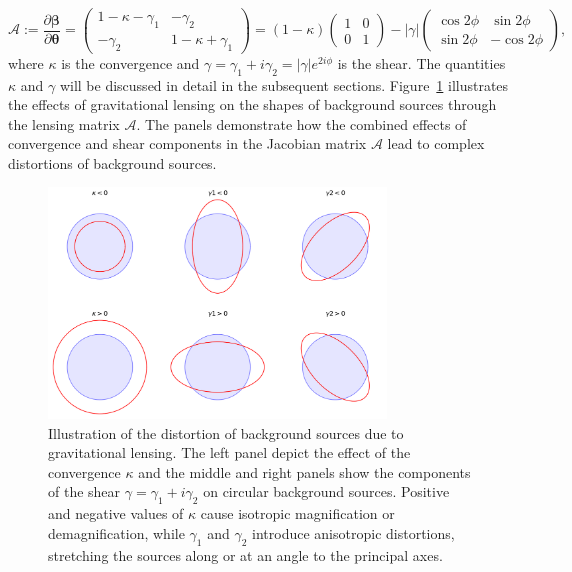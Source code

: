 \begin{equation}
\label{eq:jacobian_matrix}
    \mathcal{A} := \frac{\partial \boldsymbol{\beta}}{\partial \boldsymbol{\theta}} = 
    \begin{pmatrix}
        1 - \kappa - \gamma_1 & -\gamma_2 \\
        -\gamma_2 & 1 - \kappa + \gamma_1
    \end{pmatrix}
    = \left(1 - \kappa \right) 
    \begin{pmatrix}
        1 & 0 \\
        0 & 1
    \end{pmatrix}
    - |\gamma|
    \begin{pmatrix}
        \cos{2\phi} & \sin{2\phi} \\
        \sin{2\phi} & -\cos{2\phi}
    \end{pmatrix},
\end{equation}
where $\kappa$ is the convergence and $\gamma = \gamma_1 + i\gamma_2 = |\gamma| e^{2i\phi}$ is the shear.
The quantities $\kappa$ and $\gamma$ will be discussed in detail in the subsequent sections.
Figure~\ref{fig:distortion} illustrates the effects of gravitational lensing on the shapes of background sources through the lensing matrix $\mathcal{A}$. The panels demonstrate how the combined effects of convergence and shear components in the Jacobian matrix $\mathcal{A}$ lead to complex distortions of background sources.
\begin{figure}[ht]
    \centering
    \includegraphics[width=0.8\textwidth]{figures/distortion.png}
    \caption[Illustration of Gravitational Lensing]{Illustration of the distortion of background sources due to gravitational lensing. The left panel depict the effect of the convergence $\kappa$ and the middle and right panels show the components of the shear $\gamma = \gamma_1 + i\gamma_2$ on circular background sources. Positive and negative values of $\kappa$ cause isotropic magnification or demagnification, while $\gamma_1$ and $\gamma_2$ introduce anisotropic distortions, stretching the sources along or at an angle to the principal axes.}
    \label{fig:distortion}
\end{figure}

